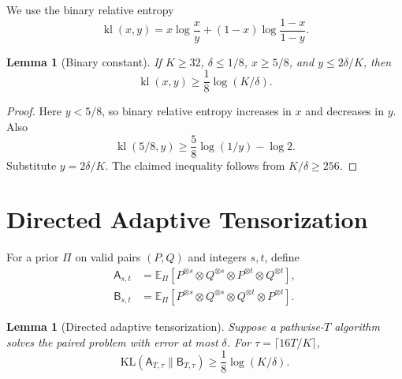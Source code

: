 \documentclass{article}
\newtheorem{lemma}[theorem]{Lemma}
\newcommand{\E}{\mathbb E}
\newcommand{\KL}{\mathrm{KL}}
\newcommand{\cA}{\mathsf A}
\newcommand{\cB}{\mathsf B}
\begin{document}
We use the binary relative entropy
\[
\operatorname{kl}(x,y)=x\log\frac{x}{y}+(1-x)\log\frac{1-x}{1-y}.
\]

\begin{lemma}[Binary constant]
\label{lem:binary}
If $K\geq32$, $\delta\leq1/8$, $x\geq5/8$, and $y\leq2\delta/K$, then
\[
\operatorname{kl}(x,y)\geq\frac18\log(K/\delta).
\]
\end{lemma}

\begin{proof}
Here $y<5/8$, so binary relative entropy increases in $x$ and decreases in $y$. Also
\[
\operatorname{kl}(5/8,y)\geq\frac58\log(1/y)-\log2.
\]
Substitute $y=2\delta/K$. The claimed inequality follows from $K/\delta\geq256$.
\end{proof}

\section{Directed Adaptive Tensorization}

For a prior $\Pi$ on valid pairs $(P,Q)$ and integers $s,t$, define
\begin{align*}
\cA_{s,t}&=\E_\Pi[P^{\otimes s}\otimes Q^{\otimes s}\otimes P^{\otimes t}\otimes Q^{\otimes t}],\\
\cB_{s,t}&=\E_\Pi[P^{\otimes s}\otimes Q^{\otimes s}\otimes Q^{\otimes t}\otimes P^{\otimes t}].
\end{align*}

\begin{lemma}[Directed adaptive tensorization]
\label{lem:full-tensor}
Suppose a pathwise-$T$ algorithm solves the paired problem with error at most $\delta$. For $\tau=\lceil16T/K\rceil$,
\[
\KL(\cA_{T,\tau}\|\cB_{T,\tau})\geq\frac18\log(K/\delta).
\]
\end{lemma}
\end{document}
